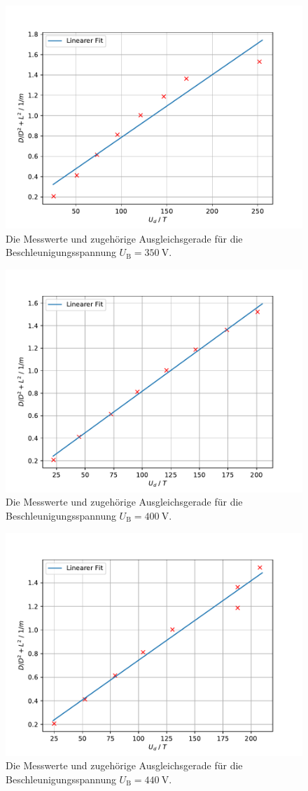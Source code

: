 \begin{figure}[h!]
	\centering
	\includegraphics[width=0.7\linewidth]{../../V350}
	\caption{Die Messwerte und zugehörige Ausgleichsgerade für die Beschleunigungsspannung $U_\text{B} = \SI{350}{\volt}$.}
	\label{fig:v350}
\end{figure}

\begin{figure}[h!]
	\centering
	\includegraphics[width=0.7\linewidth]{../../V400}
	\caption{Die Messwerte und zugehörige Ausgleichsgerade für die Beschleunigungsspannung $U_\text{B} = \SI{400}{\volt}$.}
	\label{fig:v400}
\end{figure}

\begin{figure}[h!]
	\centering
	\includegraphics[width=0.7\linewidth]{../../V440}
	\caption{Die Messwerte und zugehörige Ausgleichsgerade für die Beschleunigungsspannung $U_\text{B} = \SI{440}{\volt}$.}
	\label{fig:v440}
\end{figure}

